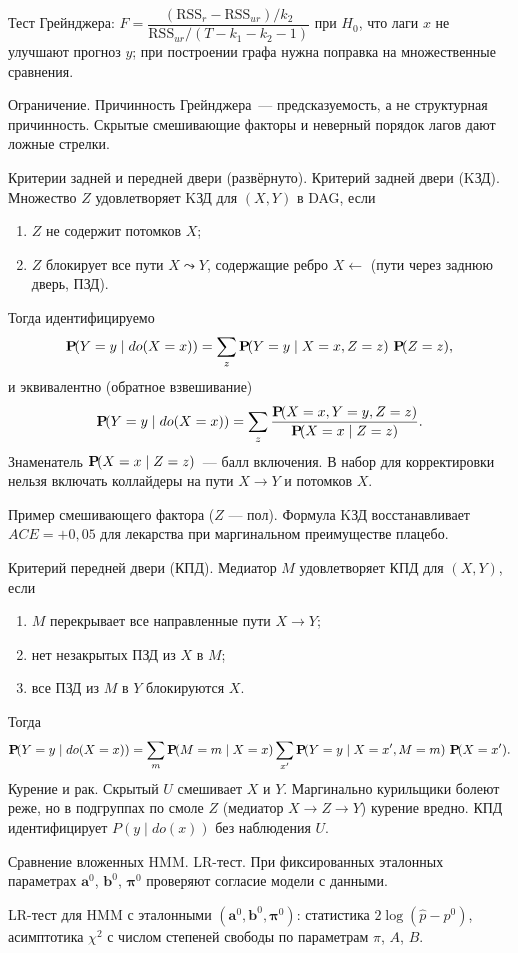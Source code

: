 Тест Грейнджера: $F=\dfrac{(\mathrm{RSS}_r-\mathrm{RSS}_{ur})/k_2}{\mathrm{RSS}_{ur}/(T-k_1-k_2-1)}$ при $H_0$, что лаги $x$ не улучшают прогноз $y$; при построении графа нужна поправка на множественные сравнения.

Ограничение. Причинность Грейнджера~--- предсказуемость, а не структурная причинность. Скрытые смешивающие факторы и неверный порядок лагов дают ложные стрелки.

Критерии задней и передней двери (развёрнуто). Критерий задней двери (KЗД). Множество $Z$ удовлетворяет KЗД для $(X,Y)$ в DAG, если
\begin{enumerate}
    \item $Z$ не содержит потомков $X$;
    \item $Z$ блокирует все пути $X\leadsto Y$, содержащие ребро $X\leftarrow$
          (пути через заднюю дверь, ПЗД).
\end{enumerate}
Тогда идентифицируемо
\[ \operatorname{\mathbf{P}\!}(Y=y\mid do(X=x))=\sum_z \operatorname{\mathbf{P}\!}(Y=y\mid X=x,Z=z)\,\operatorname{\mathbf{P}\!}(Z=z), \]
и эквивалентно (обратное взвешивание)
\[ \operatorname{\mathbf{P}\!}(Y=y\mid do(X=x))=\sum_z \frac{\operatorname{\mathbf{P}\!}(X=x,Y=y,Z=z)}{\operatorname{\mathbf{P}\!}(X=x\mid Z=z)}.
\]
Знаменатель $\operatorname{\mathbf{P}\!}(X=x\mid Z=z)$~--- балл включения.
В набор для корректировки нельзя включать коллайдеры на пути $X\to Y$ и потомков $X$.

Пример смешивающего фактора ($Z$ --- пол). Формула KЗД восстанавливает $ACE=+0{,}05$ для лекарства при маргинальном преимуществе плацебо.

Критерий передней двери (КПД). Медиатор $M$ удовлетворяет КПД для $(X,Y)$, если
\begin{enumerate}
    \item $M$ перекрывает все направленные пути $X\to Y$;
    \item нет незакрытых ПЗД из $X$ в $M$;
    \item все ПЗД из $M$ в $Y$ блокируются $X$.
\end{enumerate}
Тогда
\[ \operatorname{\mathbf{P}\!}(Y=y\mid do(X=x))=\sum_m \operatorname{\mathbf{P}\!}(M=m\mid X=x)\sum_{x'} \operatorname{\mathbf{P}\!}(Y=y\mid X=x',M=m)\,\operatorname{\mathbf{P}\!}(X=x').
\]
Курение и рак. Скрытый $U$ смешивает $X$ и $Y$. Маргинально курильщики болеют реже, но в подгруппах по смоле $Z$ (медиатор $X\to Z\to Y$) курение вредно. КПД идентифицирует $P(y\mid do(x))$ без наблюдения $U$.

Сравнение вложенных HMM. LR-тест. При фиксированных эталонных параметрах $\mathbf{a}^0$, $\mathbf{b}^0$, $\boldsymbol{\pi}^0$ проверяют согласие модели с данными.

LR-тест для HMM с эталонными $(\mathbf{a}^0,\mathbf{b}^0,\boldsymbol{\pi}^0)$: статистика $2\log(\hat p-p^0)$, асимптотика $\chi^2$ с числом степеней свободы по параметрам $\pi$, $A$, $B$.

